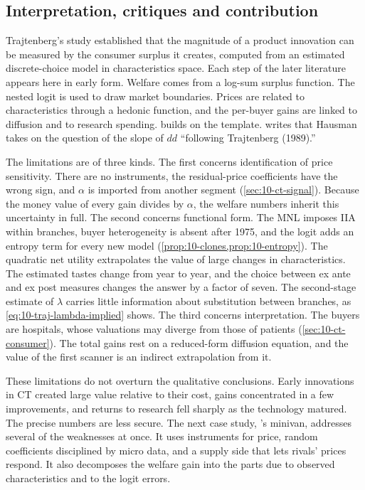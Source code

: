 \subsection{Interpretation, critiques and contribution}\label{sec:10-ct-assessment}

Trajtenberg's study established that the magnitude of a product innovation can be measured by the consumer surplus it
creates, computed from an estimated discrete-choice model in characteristics space. Each step of the later literature
appears here in early form. Welfare comes from a log-sum surplus function. The nested logit is used to draw market
boundaries. Prices are related to characteristics through a hedonic function, and the per-buyer gains are linked to
diffusion and to research spending.  builds on the template.  writes
that Hausman takes on the question of the slope of $dd$ ``following Trajtenberg (1989).''

The limitations are of three kinds. The first concerns identification of price sensitivity. There are no instruments,
the residual-price coefficients have the wrong sign, and $\alpha$ is imported from another segment
(\cref{sec:10-ct-signal}). Because the money value of every gain divides by $\alpha$, the welfare numbers inherit this
uncertainty in full. The second concerns functional form. The MNL imposes IIA within branches, buyer heterogeneity is
absent after 1975, and the logit adds an entropy term for every new model (\cref{prop:10-clones,prop:10-entropy}). The
quadratic net utility extrapolates the value of large changes in characteristics. The estimated tastes change from year
to year, and the choice between ex ante and ex post measures changes the answer by a factor of seven. The second-stage
estimate of $\lambda$ carries little information about substitution between branches, as \eqref{eq:10-traj-lambda-implied} shows.
The third concerns interpretation. The buyers are hospitals, whose valuations may diverge from those of patients
(\cref{sec:10-ct-consumer}). The total gains rest on a reduced-form diffusion equation, and the value of the first scanner
is an indirect extrapolation from it.

These limitations do not overturn the qualitative conclusions. Early innovations in CT created large value relative
to their cost, gains concentrated in a few improvements, and returns to research fell sharply as the technology matured.
The precise numbers are less secure. The next case study, \citeauthor{Petrin2002}'s minivan, addresses several of the
weaknesses at once. It uses instruments for price, random coefficients disciplined by micro data, and a supply side
that lets rivals' prices respond. It also decomposes the welfare gain into the parts due to observed characteristics
and to the logit errors.

